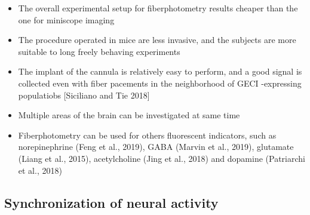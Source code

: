 \documentclass[a4paper]{article}
\begin{document}
\begin{itemize}
	
	\item The overall experimental setup for fiberphotometry results cheaper than the one for miniscope imaging 
	
	\item The procedure operated in mice are less invasive, and the subjects are more suitable to long freely behaving experiments
	
	\item The implant of the cannula is relatively easy to perform, and a good signal is collected even with fiber pacements in the neighborhood of GECI -expressing populatiobs [Siciliano and Tie 2018]
	
	\item Multiple areas of the brain can be investigated at same time 
	
	\item Fiberphotometry can be used for others fluorescent indicators, such as norepinephrine (Feng et al., 2019), GABA (Marvin et al., 2019), glutamate (Liang et al., 2015),
	acetylcholine (Jing et al., 2018) and dopamine (Patriarchi et al., 2018)
	
	
	
\end{itemize}


\subsection{Synchronization of neural activity}
\end{document}
